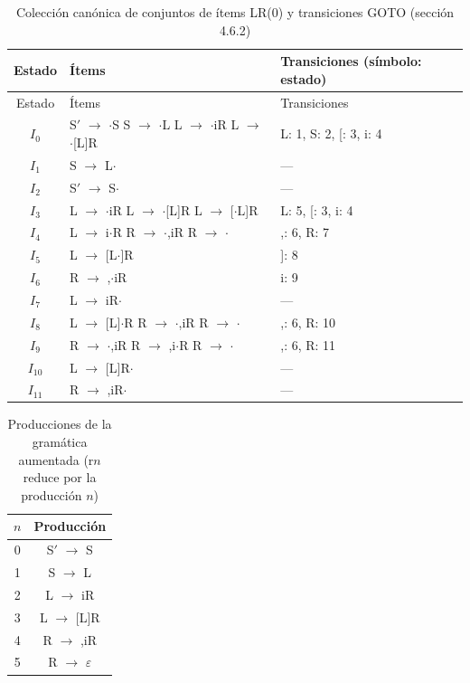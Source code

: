 \documentclass[11pt,a4paper]{article}
\begin{document}
\begin{longtable}{|c|p{5.4cm}|p{5.6cm}|}
\caption{Colección canónica de conjuntos de ítems LR(0) y transiciones GOTO (sección 4.6.2)}\\
\hline
Estado & Ítems & Transiciones (símbolo: estado) \\ \hline
\endfirsthead
\hline
Estado & Ítems & Transiciones \\ \hline
\endhead
$I_{0}$ & S$'$ $\to$ $\cdot$S \newline S $\to$ $\cdot$L \newline L $\to$ $\cdot$iR \newline L $\to$ $\cdot${[}L{]}R & L: 1, S: 2, {[}: 3, i: 4 \\ \hline
$I_{1}$ & S $\to$ L$\cdot$ & --- \\ \hline
$I_{2}$ & S$'$ $\to$ S$\cdot$ & --- \\ \hline
$I_{3}$ & L $\to$ $\cdot$iR \newline L $\to$ $\cdot${[}L{]}R \newline L $\to$ {[}$\cdot$L{]}R & L: 5, {[}: 3, i: 4 \\ \hline
$I_{4}$ & L $\to$ i$\cdot$R \newline R $\to$ $\cdot$,iR \newline R $\to$ $\cdot$ & ,: 6, R: 7 \\ \hline
$I_{5}$ & L $\to$ {[}L$\cdot${]}R & {]}: 8 \\ \hline
$I_{6}$ & R $\to$ ,$\cdot$iR & i: 9 \\ \hline
$I_{7}$ & L $\to$ iR$\cdot$ & --- \\ \hline
$I_{8}$ & L $\to$ {[}L{]}$\cdot$R \newline R $\to$ $\cdot$,iR \newline R $\to$ $\cdot$ & ,: 6, R: 10 \\ \hline
$I_{9}$ & R $\to$ $\cdot$,iR \newline R $\to$ ,i$\cdot$R \newline R $\to$ $\cdot$ & ,: 6, R: 11 \\ \hline
$I_{10}$ & L $\to$ {[}L{]}R$\cdot$ & --- \\ \hline
$I_{11}$ & R $\to$ ,iR$\cdot$ & --- \\ \hline
\end{longtable}


\begin{table}[ht]
\centering
\small
\caption{Producciones de la gramática aumentada (r$n$ reduce por la producción $n$)}
\begin{tabular}{|c|c|}
\hline
$n$ & Producción \\ \hline
0 & S$'$ $\to$ S \\ \hline
1 & S $\to$ L \\ \hline
2 & L $\to$ iR \\ \hline
3 & L $\to$ {[}L{]}R \\ \hline
4 & R $\to$ ,iR \\ \hline
5 & R $\to$ $\varepsilon$ \\ \hline
\end{tabular}
\end{table}
\end{document}
